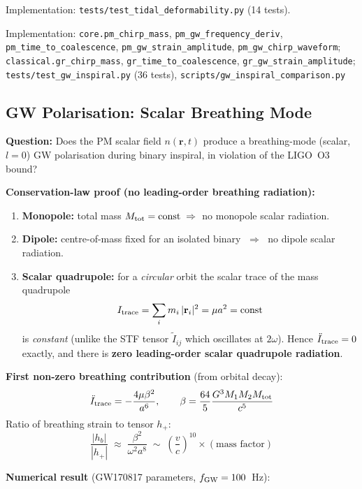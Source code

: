 \documentclass[10pt,twocolumn]{article}
\begin{document}
Implementation: \texttt{tests/test\_tidal\_deformability.py} (14 tests).

Implementation: \texttt{core.pm\_chirp\_mass}, \texttt{pm\_gw\_frequency\_deriv},
\texttt{pm\_time\_to\_coalescence}, \texttt{pm\_gw\_strain\_amplitude},
\texttt{pm\_gw\_chirp\_waveform}; \texttt{classical.gr\_chirp\_mass},
\texttt{gr\_time\_to\_coalescence}, \texttt{gr\_gw\_strain\_amplitude};
\texttt{tests/test\_gw\_inspiral.py} (36 tests),
\texttt{scripts/gw\_inspiral\_comparison.py}

\subsection*{GW Polarisation: Scalar Breathing Mode}

\noindent\textbf{Question:} Does the PM scalar field $n(\mathbf{r},t)$ produce a
breathing-mode (scalar, $l{=}0$) GW polarisation during binary inspiral, in
violation of the LIGO~O3 bound?

\noindent\textbf{Conservation-law proof (no leading-order breathing radiation):}
\begin{enumerate}
  \item \textbf{Monopole:} total mass $M_{\rm tot} = \text{const}
    \;\Rightarrow\;$ no monopole scalar radiation.
  \item \textbf{Dipole:} centre-of-mass fixed for an isolated binary
    $\;\Rightarrow\;$ no dipole scalar radiation.
  \item \textbf{Scalar quadrupole:} for a \emph{circular} orbit the scalar
    trace of the mass quadrupole
    \[
      I_{\rm trace} = \sum_i m_i \, |\mathbf{r}_i|^2 = \mu a^2 = \text{const}
    \]
    is \emph{constant} (unlike the STF tensor $\tilde I_{ij}$ which oscillates
    at $2\omega$). Hence $\ddot{I}_{\rm trace} = 0$ exactly, and there is
    \textbf{zero leading-order scalar quadrupole radiation}.
\end{enumerate}

\noindent\textbf{First non-zero breathing contribution} (from orbital decay):
\[
  \ddot{I}_{\rm trace} = -\frac{4\mu\beta^2}{a^6}, \qquad
  \beta = \frac{64}{5}\frac{G^3 M_1 M_2 M_{\rm tot}}{c^5}
\]
Ratio of breathing strain to tensor $h_+$:
\[
  \frac{|h_b|}{|h_+|} \;\approx\; \frac{\beta^2}{\omega^2 a^8}
  \;\sim\; \left(\frac{v}{c}\right)^{10} \times (\text{mass factor})
\]

\noindent\textbf{Numerical result} (GW170817 parameters, $f_{\rm GW} = 100$~Hz):
\end{document}
